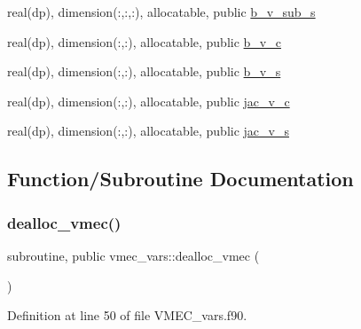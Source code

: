 \begin{DoxyCompactItemize}
real(dp), dimension(\+:,\+:,\+:), allocatable, public \hyperlink{namespacevmec__vars_aac5e249f0f14cf1e542f881d1777b730}{b\+\_\+v\+\_\+sub\+\_\+s}
\item 
real(dp), dimension(\+:,\+:), allocatable, public \hyperlink{namespacevmec__vars_ad6833cc726863147b8fed188d3a28f5d}{b\+\_\+v\+\_\+c}
\item 
real(dp), dimension(\+:,\+:), allocatable, public \hyperlink{namespacevmec__vars_ab2aa43fe35401e8f2b7ffb2facad7109}{b\+\_\+v\+\_\+s}
\item 
real(dp), dimension(\+:,\+:), allocatable, public \hyperlink{namespacevmec__vars_adcce7c5969ef8c35e8f9673ca0fed8da}{jac\+\_\+v\+\_\+c}
\item 
real(dp), dimension(\+:,\+:), allocatable, public \hyperlink{namespacevmec__vars_a633a5542080c02fe2072a6643568562b}{jac\+\_\+v\+\_\+s}
\end{DoxyCompactItemize}


\subsection{Function/\+Subroutine Documentation}
\mbox{\label{namespacevmec__vars_ace63f2f143043b860f7705dff7089676}} 
\subsubsection{\texorpdfstring{dealloc\+\_\+vmec()}{dealloc\_vmec()}}
{\footnotesize\ttfamily subroutine, public vmec\+\_\+vars\+::dealloc\+\_\+vmec (\begin{DoxyParamCaption}{ }\end{DoxyParamCaption})}



Definition at line 50 of file V\+M\+E\+C\+\_\+vars.\+f90.

